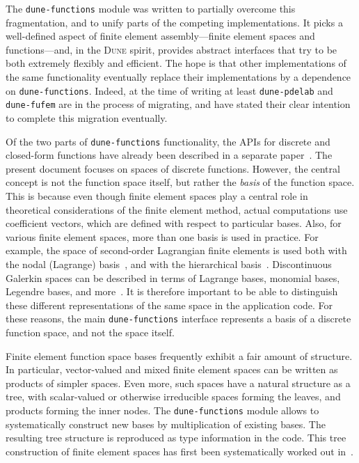 \documentclass[a4paper,10pt,headings=normal,bibliography=totoc]{scrartcl}
\newcommand{\dune}{\textsc{Dune}\xspace}
\newcommand{\dunemodule}[1]{\texttt{#1}}
\begin{document}
The \dunemodule{dune-functions}  module was written to partially overcome this fragmentation,
and to unify parts of the competing implementations.
It picks a well-defined aspect of finite element assembly---finite element spaces and functions---and,
in the \dune spirit, provides abstract interfaces that try to be both extremely flexibly
and efficient.  The hope is that other implementations of the same functionality
eventually replace their implementations by a dependence on \dunemodule{dune-functions}.
Indeed, at the time of writing at least \dunemodule{dune-pdelab} and \dunemodule{dune-fufem} are in the process
of migrating, and have stated their clear intention to complete this migration eventually.

Of the two parts of \dunemodule{dune-functions} functionality, the APIs for discrete and
closed-form functions have already been described in a separate paper~\cite{engwer_graeser_muething_sander:2015}.
The present document focuses on spaces of discrete functions.  However,
the central concept is not the function space itself, but rather the {\em basis} of the function space.
This is because even though finite element spaces play a central role in theoretical considerations of
the finite element method,
actual computations use coefficient vectors, which are defined with respect to particular bases.  Also,
for various finite element spaces, more than one basis is used in practice.  For example,
the space of second-order Lagrangian finite elements is used both with the nodal (Lagrange) basis~\cite{braess:2013},
and with the
hierarchical basis~\cite{bank:1996}.  Discontinuous Galerkin spaces can be described in terms of Lagrange bases,
monomial bases, Legendre bases, and more~\cite{hesthaven_warburton:2008}.
It is therefore important to be able to distinguish these different
representations of the same space in the application code.
For these reasons, the main \dunemodule{dune-functions} interface represents a basis of a
discrete function space, and not the space itself.

Finite element function space bases frequently exhibit a fair amount of structure.  In particular, vector-valued
and mixed finite element spaces can be written as products of simpler spaces. Even more, such spaces
have a natural structure as a tree, with scalar-valued or otherwise irreducible spaces forming the leaves, and
products forming the inner nodes. The \dunemodule{dune-functions} module
allows to systematically construct new bases by multiplication of existing bases.
The resulting tree structure is reproduced as type information in the code.
This tree construction of finite element spaces has first been systematically worked out in~\cite{muething:2015}.
\end{document}
